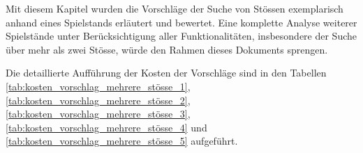Mit diesem Kapitel wurden die Vorschläge der Suche von Stössen exemplarisch anhand eines Spielstands erläutert und bewertet.
Eine komplette Analyse weiterer Spielstände unter Berücksichtigung aller Funktionalitäten,
insbesondere der Suche über mehr als zwei Stösse, würde den Rahmen dieses Dokuments sprengen.

Die detaillierte Aufführung der Kosten der Vorschläge sind in den Tabellen \ref{tab:kosten_vorschlag_mehrere_stösse_1},
\ref{tab:kosten_vorschlag_mehrere_stösse_2}, \ref{tab:kosten_vorschlag_mehrere_stösse_3},
\ref{tab:kosten_vorschlag_mehrere_stösse_4} und \ref{tab:kosten_vorschlag_mehrere_stösse_5} aufgeführt.


